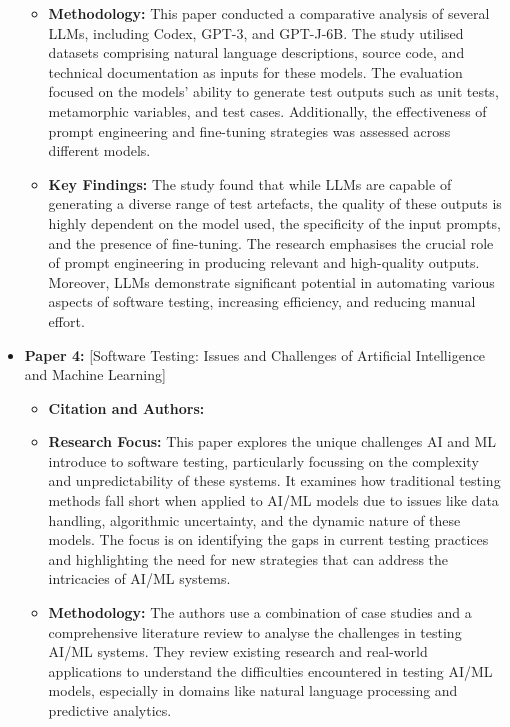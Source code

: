 \documentclass[12pt,a4paper]{article}
\begin{document}
\begin{itemize}
\begin{itemize}
        \item \textbf{Methodology:} This paper conducted a comparative analysis of several LLMs, including Codex, GPT-3, and GPT-J-6B. The study utilised datasets comprising natural language descriptions, source code, and technical documentation as inputs for these models. The evaluation focused on the models' ability to generate test outputs such as unit tests, metamorphic variables, and test cases. Additionally, the effectiveness of prompt engineering and fine-tuning strategies was assessed across different models.

        \item \textbf{Key Findings:}  The study found that while LLMs are capable of generating a diverse range of test artefacts, the quality of these outputs is highly dependent on the model used, the specificity of the input prompts, and the presence of fine-tuning. The research emphasises the crucial role of prompt engineering in producing relevant and high-quality outputs. Moreover, LLMs demonstrate significant potential in automating various aspects of software testing, increasing efficiency, and reducing manual effort.


    \end{itemize}

    \vspace{0.2cm}
    \item \textbf{Paper 4:} [Software Testing: Issues and Challenges of Artificial Intelligence and Machine Learning]
    \begin{itemize}
        \item \textbf{Citation and Authors:} \citep{Kishore21}
        \item \textbf{Research Focus:} This paper explores the unique challenges AI and ML introduce to software testing, particularly focussing on the complexity and unpredictability of these systems. It examines how traditional testing methods fall short when applied to AI/ML models due to issues like data handling, algorithmic uncertainty, and the dynamic nature of these models. The focus is on identifying the gaps in current testing practices and highlighting the need for new strategies that can address the intricacies of AI/ML systems.

        \item \textbf{Methodology:} The authors use a combination of case studies and a comprehensive literature review to analyse the challenges in testing AI/ML systems. They review existing research and real-world applications to understand the difficulties encountered in testing AI/ML models, especially in domains like natural language processing and predictive analytics.


\end{itemize}
\end{itemize}
\end{document}
